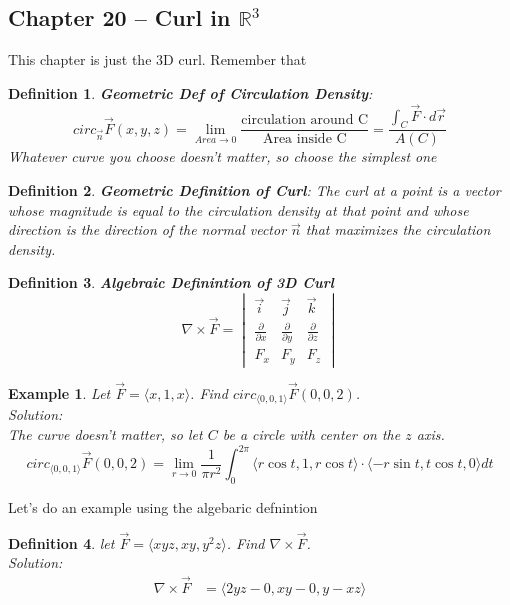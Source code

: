 \documentclass[11pt]{article}
\newtheorem{defn}{Definition}
\newtheorem{ex}{Example}
\begin{document}
      \subsection{Chapter 20 -- Curl in $\mathbb{R}^{3}$}
      This chapter is just the 3D curl. Remember that
      \begin{defn}
        \textbf{Geometric Def of Circulation Density}:
        \[circ_{\vec{n}}\vec{F}(x,y,z) = \lim_{Area \to 0} \frac{\text{circulation around C}}{\text{Area inside C}} = \frac{\int_{C}\vec{F} \cdot d\vec{r}}{A(C)}\]
        Whatever curve you choose doesn't matter, so choose the simplest one
      \end{defn}
      \begin{defn}
        \textbf{Geometric Definition of Curl}: The curl at a point is a vector whose magnitude is equal to the circulation density at that point and whose
        direction is the direction of the normal vector $\vec{n}$ that maximizes the circulation density.
      \end{defn}
      \begin{defn}
        \textbf{Algebraic Definintion of 3D Curl}
      \[\nabla \times \vec{F} = \begin{vmatrix} \vec{i} & \vec{j} & \vec{k} \\ \frac{\partial}{\partial x} & \frac{\partial}{\partial y} & \frac{\partial}{\partial z} \\ F_{x} & F_{y} & F_{z}  \end{vmatrix}\]
      \end{defn}
      \begin{ex}
        Let $\vec{F} = \langle x , 1, x \rangle$. Find $circ_{\langle 0, 0, 1\rangle} \vec{F}(0, 0, 2 )$. \\
        Solution: \\
        The curve doesn't matter, so let $C$ be a circle with center on the $z$ axis.
        \[circ_{\langle 0 ,0, 1 \rangle} \vec{F}(0,0,2) = \lim_{r\to 0}\frac{1}{\pi r^{2}}\int_{0}^{2\pi} \langle r\cos t, 1, r\cos t \rangle \cdot \langle -r\sin t,t\cos t, 0 \rangle dt \]
        \end{ex}
        Let's do an example using the algebaric defnintion
        \begin{defn}
          let $\vec{F} = \langle xyz, xy, y^{2} z \rangle$. Find $\nabla \times \vec{F}$. \\
          Solution: \\
          \begin{align*}
            \nabla \times\vec{F}
            &= \langle 2yz - 0, xy-0, y-xz\rangle
          \end{align*}
        \end{defn}
\end{document}
